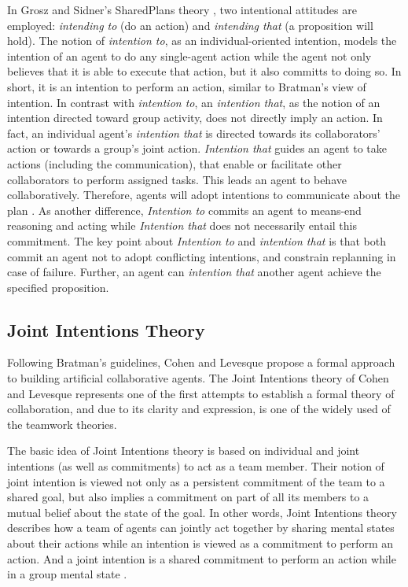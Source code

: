 \documentclass[11pt]{article}
\begin{document}
In Grosz and Sidner's SharedPlans theory \cite{grosz:plans-discourse}, two
intentional attitudes are employed: \textit{intending to} (do an action) and
\textit{intending that} (a proposition will hold). The notion of
\textit{intention to}, as an individual-oriented intention, models the intention
of an agent to do any single-agent action while the agent not only believes that
it is able to execute that action, but it also committs to doing so. In short,
it is an intention to perform an action, similar to Bratman's view of intention.
In contrast with \textit{intention to}, an \textit{intention that}, as the
notion of an intention directed toward group activity, does not directly imply
an action. In fact, an individual agent's \textit{intention that} is directed
towards its collaborators' action or towards a group's joint action.
\textit{Intention that} guides an agent to take actions (including the
communication), that enable or facilitate other collaborators to perform
assigned tasks. This leads an agent to behave collaboratively. Therefore, agents
will adopt intentions to communicate about the plan \cite{grosz:collaboration}.
As another difference, \textit{Intention to} commits an agent to means-end
reasoning and acting \cite{bratman:intentions-plans} while \textit{Intention
that} does not necessarily entail this commitment. The key point about
\textit{Intention to} and \textit{intention that} is that both commit an agent
not to adopt conflicting intentions, and constrain replanning in case of
failure. Further, an agent can \textit{intention that} another agent achieve the
specified proposition.

\subsection{Joint Intentions Theory}
\label{sec:joint-intentions}

Following Bratman's guidelines, Cohen and Levesque propose a formal approach to
building artificial collaborative agents. The Joint Intentions theory of Cohen
and Levesque \cite{cohen:teamwork, cohen:intention-commitment,
cohen:persistence-intention-commitment, cohen:intentions,
levesque:acting-together} represents one of the first attempts to establish a
formal theory of collaboration, and due to its clarity and expression, is one of
the widely used of the teamwork theories. 

The basic idea of Joint Intentions theory is based on individual and joint
intentions (as well as commitments) to act as a team member. Their notion of
joint intention is viewed not only as a persistent commitment of the team to a
shared goal, but also implies a commitment on part of all its members to a
mutual belief about the state of the goal. In other words, Joint Intentions
theory describes how a team of agents can jointly act together by sharing mental
states about their actions while an intention is viewed as a commitment to
perform an action. And a joint intention is a shared commitment to perform an
action while in a group mental state \cite{cohen:intention-commitment}. 
\end{document}
